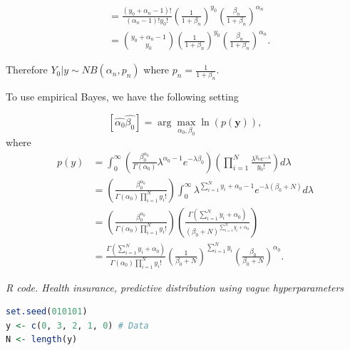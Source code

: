 \begin{enumerate}[leftmargin=*]
\begin{align}
	& = \frac{\left( y_0 + \alpha_n - 1\right)!}{\left( \alpha_n - 1\right)! y_0 ! } \left( \frac{1}{1 + \beta_n}\right)^{y_0} \left(\frac{\beta_n}{1 + \beta_n} \right)^{\alpha_n} \nonumber \\	
	& = \binom{y_0 + \alpha_n - 1}{y_0} \left( \frac{1}{1 + \beta_n}\right)^{y_0} \left(\frac{\beta_n}{1 + \beta_n} \right)^{\alpha_n}. \nonumber 
\end{align}

Therefore $Y_0 | y \sim NB(\alpha_n, p_n) $ where $p_n = \frac{1}{1 + \beta_n}$.

To use empirical Bayes, we have the following setting

\begin{equation*}
	\left[ \hat{\alpha_0} \hat{\beta_0}\right] = \arg \max_{\alpha_0, \beta_0} \ln (p(\textbf{y})), 
\end{equation*}
where
\begin{align}
	p(y) & = \int_{0}^{\infty} \left( \frac{\beta_0^{\alpha_0}}{\Gamma(\alpha_0)} \lambda^{\alpha_0 - 1} e^{-\lambda \beta_0} \right) \left(  \prod_{i = 1}^{N} \frac{\lambda^{y_0} e^{-\lambda}}{y_0!} \right)  d\lambda \\
	& = \left(  \frac{\beta_0^{\alpha_0}}{\Gamma(\alpha_0) \prod_{i = 1}^{N} y_i !} \right) \int_{0}^{\infty}\lambda^{\sum_{i = 1}^{N} y_i + \alpha_0 - 1} e^{-\lambda\left( \beta_0 + N \right)} d\lambda \nonumber \\
	& = \left(  \frac{\beta_0^{\alpha_0}}{\Gamma(\alpha_0) \prod_{i = 1}^{N} y_i !} \right) \left(   \frac{\Gamma\left( \sum_{i=1}^{N} y_i + \alpha_0 \right) }{\left(\beta_0 + N\right)^{\sum_{i=1}^{N} y_i + \alpha_0} } 	\right) \nonumber \\
	& = \frac{\Gamma\left( \sum_{i=1}^{N} y_i + \alpha_0 \right)}{\Gamma(\alpha_0) \prod_{i = 1}^{N} y_i !} \left( \frac{1}{\beta_0 + N}\right)^{\sum_{i=1}^{N} y_i} \left(\frac{\beta_0}{\beta_0 + N} \right)^{\alpha_0}.\nonumber   
\end{align}

\begin{tcolorbox}[enhanced,width=4.67in,center upper,
	fontupper=\large\bfseries,drop shadow southwest,sharp corners]
	\textit{R code. Health insurance, predictive distribution using vague hyperparameters}
\begin{VF}
\begin{lstlisting}[basicstyle=\footnotesize, language=R]
set.seed(010101)
y <- c(0, 3, 2, 1, 0) # Data
N <- length(y)


\end{lstlisting}
\end{VF}
\end{tcolorbox}
\end{enumerate}
